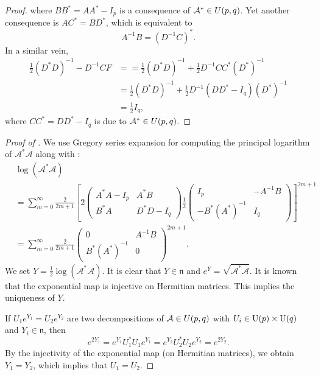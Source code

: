 \begin{proof}
    where $BB^\ast=AA^\ast-I_p$ is a consequence of $\mathcal{A}^\ast\in U(p,q)$. Yet another consequence is $AC^\ast=BD^\ast$, which is equivalent to
    \begin{displaymath}
        A^{-1}B=(D^{-1}C)^\ast.
    \end{displaymath}
    In a similar vein,
    \begin{align*}
        \frac{1}{2}(D^\ast D)^{-1}-D^{-1}CF & = =\frac{1}{2}(D^\ast D)^{-1}+\frac{1}{2}D^{-1}CC^\ast (D^{\ast})^{-1} \\
        & = \frac{1}{2}(D^\ast D)^{-1}+\frac{1}{2}D^{-1}(DD^\ast-I_q)(D^{\ast})^{-1} \\
        & = \frac{1}{2}I_q,
    \end{align*}
    where $CC^\ast=DD^\ast-I_q$ is due to $\mathcal{A}^\ast\in U(p,q)$.
\end{proof}

\begin{proof}[Proof of ]
    We use Gregory series expansion for computing the principal logarithm of $\mathcal{A}^\ast\mathcal{A}$ along with :
    \begin{align*}
        & \log (\mathcal{A}^\ast\mathcal{A}) 
        \\
        & = \sum_{m=0}^\infty{\frac{2}{2m+1}}\left[2\left(\begin{array}{cc}
        A^\ast A-I_p & A^\ast B\\
        B^\ast A & D^\ast D-I_q
        \end{array}\right)
        \frac{1}{2}\left(\begin{array}{cc}
        I_p & -A^{-1}B\\
        -B^\ast (A^\ast)^{-1} & I_q
        \end{array}\right)\right]^{2m+1}\\
        & = \sum_{m=0}^\infty{\frac{2}{2m+1}}\left(\begin{array}{cc}
        0 & A^{-1}B\\
        B^\ast (A^\ast)^{-1} & 0
        \end{array}\right)^{2m+1}.
    \end{align*}
    We set $Y=\frac{1}{2}\log (\mathcal{A}^\ast\mathcal{A})$. It is clear that $Y\in\mathfrak{n}$ and $e^Y=\sqrt{\mathcal{A}^\ast\mathcal{A}}$. It is known that the exponential map is injective on Hermitian matrices. This implies the uniqueness of $Y$.
    
    \vspace{0.1cm}
    \hf If $U_1e^{Y_1}=U_2 e^{Y_2}$ are two decompositions of $\mathcal{A}\in U(p,q)$ with $U_i\in \textup{U}(p)\times\textup{U}(q)$ and $Y_i\in\mathfrak{n}$, then 
    \begin{displaymath}
        e^{2Y_1}=e^{Y_1}U_1^\ast U_1 e^{Y_1}=e^{Y_2}U_2^\ast U_2 e^{Y_2}=e^{2Y_2}.
    \end{displaymath}
    By the injectivity of the exponential map (on Hermitian matrices), we obtain $Y_1=Y_2$, which implies that $U_1=U_2$.
\end{proof}


